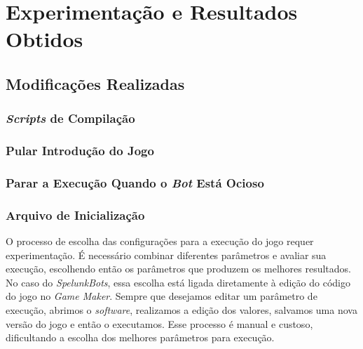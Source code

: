 \chapter{\label{chap:experimentation-and-results}Experimentação e Resultados Obtidos}


\section{\label{section:modifications}Modificações Realizadas}


\subsection{\textit{Scripts} de Compilação}

\subsection{Pular Introdução do Jogo}

\subsection{Parar a Execução Quando o \textit{Bot} Está Ocioso}

\subsection{Arquivo de Inicialização}

O processo de escolha das configurações para a execução do jogo requer
experimentação. É necessário combinar diferentes parâmetros e avaliar sua
execução, escolhendo então os parâmetros que produzem os melhores resultados.
No caso do \textit{SpelunkBots}, essa escolha está ligada diretamente à edição
do código do jogo no \textit{Game Maker}. Sempre que desejamos editar um
parâmetro de execução, abrimos o \textit{software}, realizamos a edição dos
valores, salvamos uma nova versão do jogo e então o executamos. Esse processo é
manual e custoso, dificultando a escolha dos melhores parâmetros para execução.  


